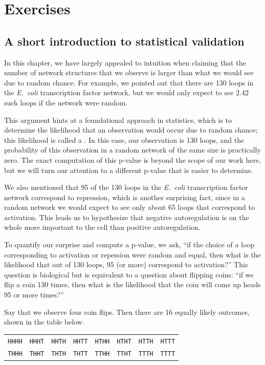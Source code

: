 \newpage

\FloatBarrier
\section{Exercises}
\label{sec:exercises}

\subsection{A short introduction to statistical validation}

In this chapter, we have largely appealed to intuition when claiming that the number of network structures that we observe is larger than what we would see due to random chance. For example, we pointed out that there are 130 loops in the \textit{E.~coli} transcription factor network, but we would only expect to see 2.42 such loops if the network were random.

This argument hints at a foundational approach in statistics, which is to determine the likelihood that an observation would occur due to random chance; this likelihood is called a . In this case, our observation is 130 loops, and the probability of this observation in a random network of the same size is practically zero. The exact computation of this p-value is beyond the scope of our work here, but we will turn our attention to a different p-value that is easier to determine.

We also mentioned that 95 of the 130 loops in the \textit{E.~coli} transcription factor network correspond to repression, which is another surprising fact, since in a random network we would expect to see only about 65 loops that correspond to activation. This leads us to hypothesize that negative autoregulation is on the whole more important to the cell than positive autoregulation.

To quantify our surprise and compute a p-value, we ask, ``if the choice of a loop corresponding to activation or repession were random and equal, then what is the likelihood that out of 130 loops, 95 (or more) correspond to activation?'' This question is biological but is equivalent to a question about flipping coins: ``if we flip a coin 130 times, then what is the likelihood that the coin will come up heads 95 or more times?''

Say that we observe four coin flips. Then there are 16 equally likely outcomes, shown in the table below.

\begin{center}
\begin{tabular}{c c c c c c c c}
\texttt{HHHH} & \texttt{HHHT} & \texttt{HHTH} & \texttt{HHTT} & \texttt{HTHH} & \texttt{HTHT} & \texttt{HTTH} & \texttt{HTTT}\\
\texttt{THHH} & \texttt{THHT} & \texttt{THTH} & \texttt{THTT} & \texttt{TTHH} & \texttt{TTHT} & \texttt{TTTH} & \texttt{TTTT}\\
\end{tabular}
\end{center}


